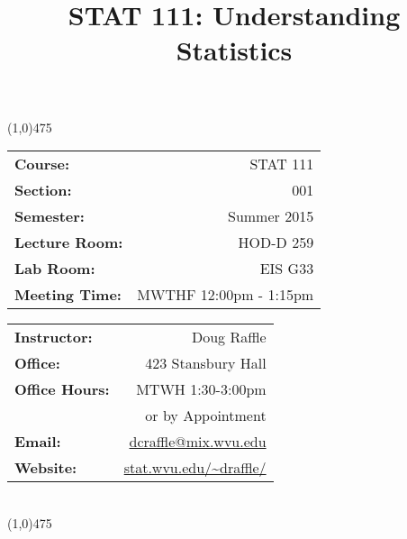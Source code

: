 \documentclass[10pt]{article}
\date{}
\title{\vspace{-50pt}\bfseries STAT 111: Understanding Statistics \vspace{-50pt}}
\begin{document}
\maketitle
\setlength{\parindent}{0pt}

\line(1,0){475}\\
\begin{minipage}[t]{0.5\textwidth}
  \begin{flushleft}
    \begin{tabular}{l r}
      \textbf{Course:} & STAT 111\\
      \textbf{Section:} & 001\\
      \textbf{Semester:} & Summer 2015\\
      \textbf{Lecture Room:} & HOD-D 259\\
      \textbf{Lab Room:} & EIS G33\\
      \textbf{Meeting Time:} & MWTHF 12:00pm - 1:15pm\\
    \end{tabular}
  \end{flushleft}
\end{minipage}
\begin{minipage}[t]{0.5\textwidth}
  \begin{flushright}
    \begin{tabular}{l r}
      \textbf{Instructor:} & Doug Raffle\\
      \textbf{Office:} & 423 Stansbury Hall\\
      \textbf{Office Hours:} & MTWH 1:30-3:00pm\\ & or by Appointment\\
      \textbf{Email:} &
        \href{mailto:dcraffle@mix.wvu.edu}{dcraffle@mix.wvu.edu}\\
      \textbf{Website:} & \url{stat.wvu.edu/~draffle/}\\
    \end{tabular}
  \end{flushright}
\end{minipage}\\
\vspace{10pt}
\line(1,0){475}

\end{document}
